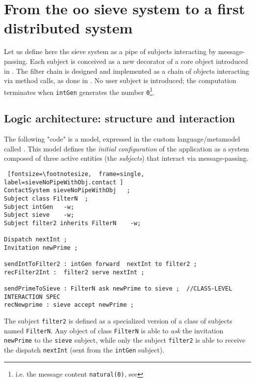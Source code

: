 \documentclass{../llncs}
\begin{document}
\newpage
\section{From the oo sieve system to a first distributed system}
Let us define here the sieve system as a pipe of subjects interacting by message-passing. Each subject is conceived as a new decorator of a core object introduced in . 
The filter chain is designed and implemented as a chain of objects interacting via method calls, as done in .
No user subject is introduced; the computation terminates when \texttt{intGen} generates the  number \texttt{0}\footnote{i.e. the message content \texttt{natural(0)}, see }.

\subsection{Logic architecture: structure and interaction}
The following "code" is a model, expressed in the custom language/metamodel called \contact{} \cite{Nat2013a}. This model defines the \textit{initial configuration} of the application as a system composed of three active entities (the \textit{subjects}) that interact via message-passing.

\begin{Verbatim} [fontsize=\footnotesize,  frame=single, label=sieveNoPipeWithObj.contact ]
ContactSystem sieveNoPipeWithObj   ;    
Subject class FilterN  ;   
Subject intGen   -w;           
Subject sieve    -w;  
Subject filter2 inherits FilterN    -w;       
            
Dispatch nextInt ;    
Invitation newPrime ; 

sendIntToFilter2 : intGen forward  nextInt to filter2 ;
recFilter2Int :  filter2 serve nextInt ;

sendPrimeToSieve : FilterN ask newPrime to sieve ;	//CLASS-LEVEL INTERACTION SPEC
recNewprime : sieve accept newPrime ;
\end{Verbatim}

The subject \texttt{filter2} is defined as a specialized version of a class of subjects named \texttt{FilterN}. Any object of class \texttt{FilterN} is able to \textit{ask} the invitation \texttt{newPrime} to the \texttt{sieve} subject, while only the subject \texttt{filter2} is able to receive the dispatch \texttt{nextInt} (sent from the \texttt{intGen} subject).
\end{document}
